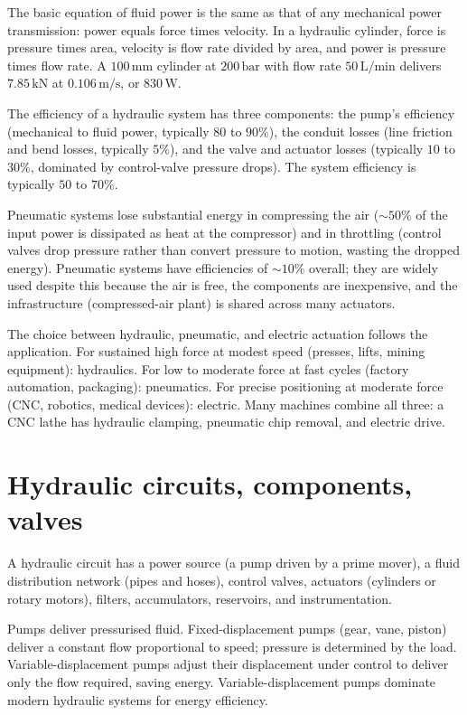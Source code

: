 The basic equation of fluid power is the same as that of any mechanical power transmission: power equals force times velocity. In a hydraulic cylinder, force is pressure times area, velocity is flow rate divided by area, and power is pressure times flow rate. A $100\,\text{mm}$ cylinder at $200\,\text{bar}$ with flow rate $50\,\text{L/min}$ delivers $7.85\,\text{kN}$ at $0.106\,\text{m/s}$, or $830\,\text{W}$.

The efficiency of a hydraulic system has three components: the pump's efficiency (mechanical to fluid power, typically $80$ to $90\%$), the conduit losses (line friction and bend losses, typically $5\%$), and the valve and actuator losses (typically $10$ to $30\%$, dominated by control-valve pressure drops). The system efficiency is typically $50$ to $70\%$.

Pneumatic systems lose substantial energy in compressing the air ($\sim 50\%$ of the input power is dissipated as heat at the compressor) and in throttling (control valves drop pressure rather than convert pressure to motion, wasting the dropped energy). Pneumatic systems have efficiencies of $\sim 10\%$ overall; they are widely used despite this because the air is free, the components are inexpensive, and the infrastructure (compressed-air plant) is shared across many actuators.

The choice between hydraulic, pneumatic, and electric actuation follows the application. For sustained high force at modest speed (presses, lifts, mining equipment): hydraulics. For low to moderate force at fast cycles (factory automation, packaging): pneumatics. For precise positioning at moderate force (CNC, robotics, medical devices): electric. Many machines combine all three: a CNC lathe has hydraulic clamping, pneumatic chip removal, and electric drive.

\section{Hydraulic circuits, components, valves}

A hydraulic circuit has a power source (a pump driven by a prime mover), a fluid distribution network (pipes and hoses), control valves, actuators (cylinders or rotary motors), filters, accumulators, reservoirs, and instrumentation.

Pumps deliver pressurised fluid. Fixed-displacement pumps (gear, vane, piston) deliver a constant flow proportional to speed; pressure is determined by the load. Variable-displacement pumps adjust their displacement under control to deliver only the flow required, saving energy. Variable-displacement pumps dominate modern hydraulic systems for energy efficiency.

